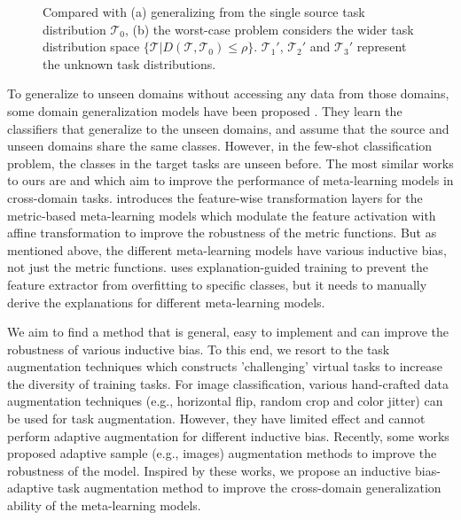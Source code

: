\documentclass{article}
\begin{document}
\begin{figure}
    \centering
    \caption{Compared with (a) generalizing from the single source task distribution $\mathcal{T}_0$, (b) the worst-case problem considers the wider task distribution space $\{\mathcal{T}|D(\mathcal{T},\mathcal{T}_0)\leq\rho\}$. $\mathcal{T}_1'$, $\mathcal{T}_2'$ and $\mathcal{T}_3'$ represent the unknown task distributions.}
    \label{fig1}
\end{figure}

To generalize to unseen domains without accessing any data from those domains, some domain generalization models have been proposed \cite{volpi2018generalizing,DBLP:conf/icml/LiYZH19}. They learn the classifiers that generalize to the unseen domains, and assume that the source and unseen domains share the same classes. However, in the few-shot classification problem, the classes in the target tasks are unseen before. The most similar works to ours are \cite{DBLP:conf/iclr/TsengLH020} and \cite{sun2020explanation} which aim to improve the performance of meta-learning models in cross-domain tasks. \cite{DBLP:conf/iclr/TsengLH020} introduces the feature-wise transformation layers for the metric-based meta-learning models which modulate the feature activation with affine transformation to improve the robustness of the metric functions. But as mentioned above, the different meta-learning models have various inductive bias, not just the metric functions. \cite{sun2020explanation}
uses explanation-guided training to prevent the feature extractor from overfitting to specific classes, but it needs to manually derive the explanations for different meta-learning models.

We aim to find a method that is general, easy to implement and can improve the robustness of various inductive bias. To this end, we resort to the task augmentation techniques which constructs 'challenging' virtual tasks to increase the diversity of training tasks. For image classification, various hand-crafted data augmentation techniques (e.g., horizontal flip, random crop and color jitter) can be used for task augmentation. However, they have limited effect and cannot perform adaptive augmentation for different inductive bias. Recently, some works \cite{DBLP:conf/iclr/SinhaND18,volpi2018generalizing} proposed adaptive sample (e.g., images) augmentation methods to improve the robustness of the model. Inspired by these works, we propose an inductive bias-adaptive task augmentation method to improve the cross-domain generalization ability of the meta-learning models.
\end{document}
